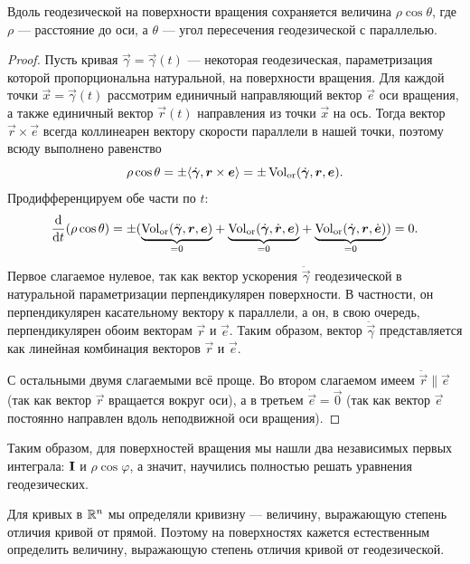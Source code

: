 \begin{theorem}[Клеро] \label{theorem:Clairaut}
	Вдоль геодезической на поверхности вращения сохраняется величина $\rho\cos\theta$, где $\rho$ --- расстояние до оси, а $\theta$ --- угол пересечения геодезической с параллелью.
\end{theorem}

\begin{proof}
	Пусть кривая $\vec{\gamma} = \vec{\gamma}(t)$ --- некоторая геодезическая, параметризация которой пропорциональна натуральной, на поверхности вращения. Для каждой точки $\vec{x} = \vec{\gamma}(t)$ рассмотрим единичный направляющий вектор $\vec{e}$ оси вращения, а также единичный вектор $\vec{r}(t)$ направления из точки $\vec{x}$ на ось. Тогда вектор $\vec{r} \times \vec{e}$ всегда коллинеарен вектору скорости параллели в нашей точки, поэтому всюду выполнено равенство
	\[
		\rho\cos\theta = \pm\langle\dot{\boldsymbol{\gamma}}, \boldsymbol{r} \times \boldsymbol{e}\rangle = \pm\operatorname{Vol}_{\mathrm{or}}(\dot{\boldsymbol{\gamma}}, \boldsymbol{r}, \boldsymbol{e}).
	\]
	Продифференцируем обе части по $t$:
	\[
		\frac{\mathop{}\!\mathrm{d}}{\mathop{}\!\mathrm{d} t}(\rho\cos\theta) = \pm({\underbrace{\operatorname{Vol}_{\mathrm{or}}(\ddot{\boldsymbol{\gamma}}, \boldsymbol{r}, \boldsymbol{e})}_{= 0}} + {\underbrace{\operatorname{Vol}_{\mathrm{or}}(\dot{\boldsymbol{\gamma}}, \dot{\boldsymbol{r}}, \boldsymbol{e})}_{= 0}} + {\underbrace{\operatorname{Vol}_{\mathrm{or}}(\dot{\boldsymbol{\gamma}}, \boldsymbol{r}, \dot{\boldsymbol{e}})}_{= 0}}) = 0.
	\]

	Первое слагаемое нулевое, так как вектор ускорения $\ddot{\vec{\gamma}}$ геодезической в натуральной параметризации перпендикулярен поверхности. В частности, он перпендикулярен касательному вектору к параллели, а он, в свою очередь, перпендикулярен обоим векторам $\vec{r}$ и $\vec{e}$. Таким образом, вектор $\ddot{\vec{\gamma}}$ представляется как линейная комбинация векторов $\vec{r}$ и $\vec{e}$.

	С остальными двумя слагаемыми всё проще. Во втором слагаемом имеем $\ddot{\vec{r}} \parallel \vec{e}$ (так как вектор $\vec{r}$ вращается вокруг оси), а в третьем $\dot{\vec{e}} = \vec{0}$ (так как вектор $\vec{e}$ постоянно направлен вдоль неподвижной оси вращения).
\end{proof}

Таким образом, для поверхностей вращения мы нашли два независимых первых интеграла: $\boldsymbol{\operatorname{I}}$ и $\rho\cos\varphi$, а значит, научились полностью решать уравнения геодезических.

Для кривых в $\mathbb{R}^n$ мы определяли кривизну --- величину, выражающую степень отличия кривой от прямой. Поэтому на поверхностях кажется естественным определить величину, выражающую степень отличия кривой от геодезической.

